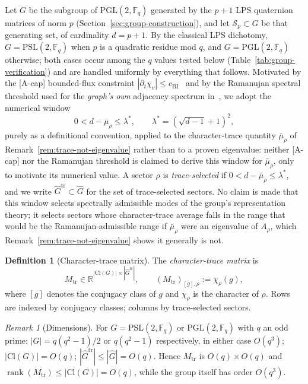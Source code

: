 \documentclass[11pt,a4paper]{article}
\theoremstyle{plain}
\theoremstyle{definition}
\newtheorem{definition}[theorem]{Definition}
\theoremstyle{remark}
\newtheorem{remark}[theorem]{Remark}
\newcommand{\F}{\mathbb{F}}
\newcommand{\R}{\mathbb{R}}
\newcommand{\Cl}{\mathrm{Cl}}
\newcommand{\rank}{\operatorname{rank}}
\newcommand{\PSL}{\mathrm{PSL}}
\newcommand{\adm}{\mathrm{tr}}
\newcommand{\Gadm}{\widehat{G}^{\adm}}
\newcommand{\Madm}{M_{\adm}}
\newcommand{\mubar}{\bar\mu_\rho}
\begin{document}
      Let $G$ be the subgroup of $\mathrm{PGL}(2,\F_q)$ generated by the $p+1$ LPS quaternion
      matrices of norm $p$ (Section~\ref{sec:group-construction}), and let $\mathcal{S}_p \subset G$
      be that generating set, of cardinality $d = p+1$.
      By the classical LPS dichotomy, $G = \PSL(2,\F_q)$ when $p$ is a quadratic residue mod $q$, and
      $G = \mathrm{PGL}(2,\F_q)$ otherwise; both cases occur among the $q$ values tested below
      (Table~\ref{tab:group-verification}) and are handled uniformly by everything that follows.
      Motivated by the [A-cap] bounded-flux constraint $|\partial_t \chi_v| \le
      c_{\mathrm{BI}}$~\cite{Beau2026a1} and by the Ramanujan spectral threshold used for the
      \emph{graph's own} adjacency spectrum in~\cite{Beau2026a1}, we adopt the numerical window
      \begin{equation}
        \label{eq:admissibility-envelope}
        0 < d - \mubar \le \lambda^*, \qquad \lambda^* = (\sqrt{d-1}+1)^2,
      \end{equation}
      purely as a definitional convention, applied to the character-trace quantity $\mubar$ of
      Remark~\ref{rem:trace-not-eigenvalue} rather than to a proven eigenvalue: neither [A-cap] nor
      the Ramanujan threshold is claimed to derive this window for $\mubar$, only to motivate its
      numerical value.
      A sector $\rho$ is \emph{trace-selected} if $0 < d-\mubar \le \lambda^*$, and we write
      $\Gadm \subset \widehat{G}$ for the set of trace-selected sectors.
      No claim is made that this window selects spectrally admissible modes of the group's
      representation theory; it selects sectors whose character-trace average falls in the range that
      would be the Ramanujan-admissible range if $\mubar$ were an eigenvalue of $A_\rho$, which
      Remark~\ref{rem:trace-not-eigenvalue} shows it generally is not.

      \begin{definition}[Character-trace matrix]
        \label{def:admissible-character-matrix}
        The \emph{character-trace matrix} is
        \[
          \Madm \in \R^{|\Cl(G)| \times |\Gadm|},
          \qquad
          (\Madm)_{[g], \rho} := \chi_\rho(g),
        \]
        where $[g]$ denotes the conjugacy class of $g$ and $\chi_\rho$ is the character of $\rho$.
        Rows are indexed by conjugacy classes; columns by trace-selected sectors.
      \end{definition}

      \begin{remark}[Dimensions]
        \label{rem:dimensions}
        For $G = \PSL(2,\F_q)$ or $\mathrm{PGL}(2,\F_q)$ with $q$ an odd prime:
        $|G| = q(q^2-1)/2$ or $q(q^2-1)$ respectively, in either case $O(q^3)$;
        $|\Cl(G)| = O(q)$;
        $|\Gadm| \le |\widehat{G}| = O(q)$.
        Hence $\Madm$ is $O(q) \times O(q)$ and $\rank(\Madm) \le |\Cl(G)| = O(q)$,
        while the group itself has order $O(q^3)$.
      \end{remark}
\end{document}
